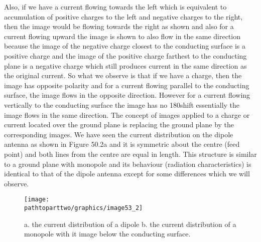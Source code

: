 Also, if we have a current flowing towards the left which is equivalent to accumulation of positive charges to the left and negative charges to the right, then the image would be flowing towards the right as shown and also for a current flowing upward the image is shown to also flow in the same direction because the image of the negative charge closest to the conducting surface is a positive charge and the image of the positive charge farthest to the conducting plane is a negative charge which still produces current in the same direction as the original current. So what we observe is that if we have a charge, then the image has opposite polarity and for a current flowing parallel to the conducting surface, the image flows in the opposite direction. However for a current flowing vertically to the conducting surface the image has no 180\textdegree \space shift essentially the image flows in the same direction. The concept of images applied to a charge or current located over the ground plane is replacing the ground plane by the corresponding images. We have seen the current distribution on the dipole antenna as shown in Figure 50.2a and it is symmetric about the centre (feed point) and both lines from the centre are equal in length. This structure is similar to a ground plane with monopole and its behaviour (radiation characteristics) is identical to that of the dipole antenna except for some differences which we will observe.

\begin{figure}[h]
\centering
\texttt{[image: \\pathtoparttwo/graphics/image53\_2]}
\caption{a. the current distribution of a dipole 
	b. the current distribution of a monopole with it image below the conducting surface.}
\label{fig:fig2}
\end{figure}

